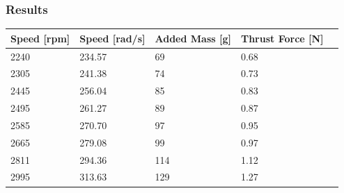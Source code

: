 \subsubsection{Results}
\begin{table}[H]
	\centering
	\begin{tabular}{|l|l|l|l|p{4.3cm}|}
		\hline%
		\textbf{Speed [rpm]}    & \textbf{Speed [rad/s]} & \textbf{Added Mass [g]}  & \textbf{Thrust Force [N]} \\ 
		\hline%
		2240                        	   &  234.57                           & 69                       & 0.68         \\
		\hline%
		2305 						       &  241.38				           & 74                       & 0.73         \\
		\hline%
		2445                               &  256.04   			               & 85                       & 0.83         \\
		\hline%
		2495                               &  261.27			               & 89                       & 0.87         \\
		\hline%
		2585                               &  270.70                          & 97                       & 0.95         \\
		\hline%
		2665 						       &  279.08			           & 99                       & 0.97         \\
		\hline%
		2811                               &  294.36   			           & 114                      & 1.12         \\
		\hline%
		2995                               &  313.63                          & 129                      & 1.27         \\

\end{tabular}
\end{table}
